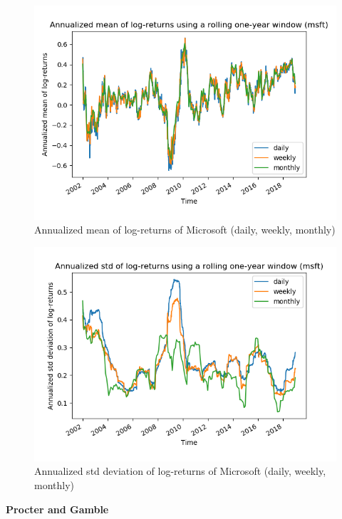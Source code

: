 \documentclass[10pt]{article}
\newenvironment{exercise}[2][Exercise]{\begin{trivlist}
  \item[\hskip \labelsep {\bfseries #1}\hskip \labelsep {\bfseries #2.}]}{\end{trivlist}}
\begin{document}
\begin{exercise}{4}
\begin{figure}[H]
		\centering
		\includegraphics[scale=0.5]{Figures/problem4d_mean_msft.png}	
		\caption{Annualized mean of log-returns of Microsoft (daily, weekly, monthly)}	
		\label{fig:problem3d_mean_msft}
	
	\end{figure}
	
	\begin{figure}[H]
	
		\centering
		\includegraphics[scale=0.5]{Figures/problem4d_std_msft.png}	
		\caption{Annualized std deviation of log-returns of Microsoft (daily, weekly, monthly)}	
		\label{fig:problem3d_std_msft}
	
	\end{figure}	  
  
	\bigbreak	
		
	\textbf{Procter and Gamble}
	

\end{exercise}
\end{document}
